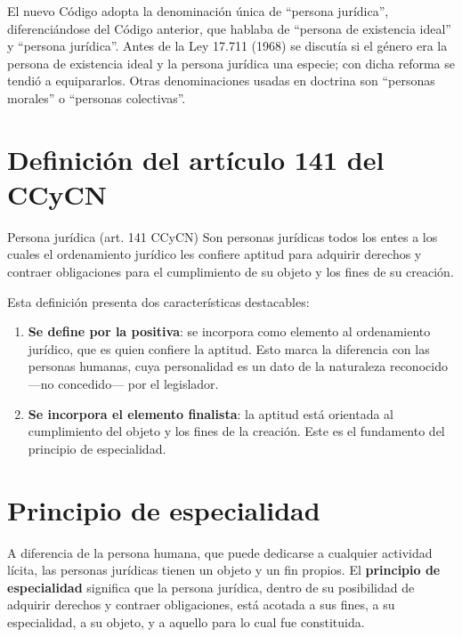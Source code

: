 \documentclass[12pt,oneside]{book}
\begin{document}
\begin{note}
El nuevo Código adopta la denominación única de ``persona jurídica'', diferenciándose del Código anterior, que hablaba de ``persona de existencia ideal'' y ``persona jurídica''. Antes de la Ley 17.711 (1968) se discutía si el género era la persona de existencia ideal y la persona jurídica una especie; con dicha reforma se tendió a equipararlos. Otras denominaciones usadas en doctrina son ``personas morales'' o ``personas colectivas''.
\end{note}

\section{Definición del artículo 141 del CCyCN}

\begin{definition}{Persona jurídica (art. 141 CCyCN)}
Son personas jurídicas todos los entes a los cuales el ordenamiento jurídico les confiere aptitud para adquirir derechos y contraer obligaciones para el cumplimiento de su objeto y los fines de su creación.
\end{definition}

Esta definición presenta dos características destacables:

\begin{enumerate}
    \item \textbf{Se define por la positiva}: se incorpora como elemento al ordenamiento jurídico, que es quien confiere la aptitud. Esto marca la diferencia con las personas humanas, cuya personalidad es un dato de la naturaleza reconocido —no concedido— por el legislador.
    \item \textbf{Se incorpora el elemento finalista}: la aptitud está orientada al cumplimiento del objeto y los fines de la creación. Este es el fundamento del principio de especialidad.
\end{enumerate}

\section{Principio de especialidad}

A diferencia de la persona humana, que puede dedicarse a cualquier actividad lícita, las personas jurídicas tienen un objeto y un fin propios. El \textbf{principio de especialidad} significa que la persona jurídica, dentro de su posibilidad de adquirir derechos y contraer obligaciones, está acotada a sus fines, a su especialidad, a su objeto, y a aquello para lo cual fue constituida.
\end{document}
